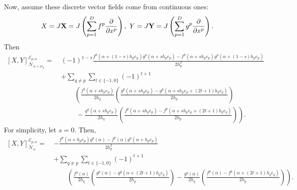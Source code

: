 \begin{discussion}
  Now, assume these discrete vector fields come from continuous ones:
  \begin{equation}
    X = J {\bf X}
      = J\left(\sum_{p = 1}^D f^p \frac{\partial}{\partial x^p}\right),\
    Y = J {\bf Y}
      = J\left(\sum_{p = 1}^D g^p \frac{\partial}{\partial x^p}\right).
  \end{equation}
  Then
  \begin{equation}
    \begin{split}
      [X, Y]^{\mathcal{E}_{p, \alpha}}_{\mathcal{N}_{\alpha + s e_p}} = \
      &
      (-1)^{1 - s} 
        \frac{f^p(\alpha + (1 - s) h_p e_p) g^p(\alpha + s h_p e_p)
          - f^p(\alpha + s h_p e_p) g^p(\alpha + (1 - s) h_p e_p)}{2 h_p^2} \\
      &
      +
      \sum_{q \neq p}
        \sum_{t \in \{-1, 0\}}
          (-1)^{t + 1} \\
      & \qquad
          \left(
            \frac{f^q(\alpha + s h_p e_p)}{2 h_q}
            \left(
              \frac{g^p(\alpha + s h_p e_p)
              - g^p(\alpha + s h_p e_p + (2 t + 1) h_q e_q)}{2 h_p}
            \right)
          \right. \\
      & \qquad \
            -
          \left.
            \frac{g^q(\alpha + s h_p e_p)}{2 h_q}
            \left(
              \frac{f^p(\alpha + s h_p e_p)
              - f^p(\alpha + s h_p e_p + (2 t + 1) h_q e_q)}{2 h_p}
            \right)
          \right).
    \end{split}
  \end{equation}
  For simplicity, let $s = 0$.
  Then,
  \begin{equation}
    \begin{split}
        [X, Y]^{\mathcal{E}_{p, \alpha}}_{\mathcal{N}_{\alpha}} = \
      & -
        \frac
        {f^p(\alpha + h_p e_p) g^p(\alpha) - f^p(\alpha) g^p(\alpha + h_p e_p)}
        {2 h_p^2} \\
      & +
        \sum_{q \neq p}
        \sum_{t \in \{-1, 0\}}
          (-1)^{t + 1} \\
      & \qquad
          \left(
            \frac{f^q(\alpha)}{2 h_q}
            \left(
              \frac{g^p(\alpha)
              - g^p(\alpha + (2 t + 1) h_q e_q)}{2 h_p}
            \right)
            -
            \frac{g^q(\alpha)}{2 h_q}
            \left(
              \frac{f^p(\alpha)
              - f^p(\alpha + (2 t + 1) h_q e_q)}{2 h_p}
            \right)
          \right).
    \end{split}
  \end{equation}

\end{discussion}
